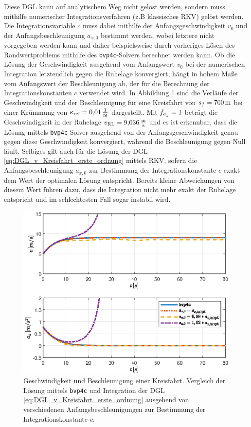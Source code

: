Diese \gls{DGL} kann auf analytischem Weg nicht gelöst werden, sondern muss mithilfe numerischer Integrationsverfahren (z.B klassisches \gls{RKV}) gelöst werden. Die Integrationsvariable $c$ muss dabei mithilfe der Anfangsgeschwindigkeit $v_0$ und der  Anfangsbeschleunigung $a_{x,0}$ bestimmt werden, wobei letztere nicht vorgegeben werden kann und daher beispielsweise durch vorheriges Lösen des Randwertproblems mithilfe des \texttt{bvp4c}-Solvers berechnet werden kann. Ob die Lösung der Geschwindigkeit ausgehend vom Anfangswert $v_0$ bei der numerischen Integration letztendlich gegen die Ruhelage konvergiert, hängt in hohem Maße vom Anfangswert der Beschleunigung ab, der für die Berechnung der Integrationskonstanten $c$ verwendet wird. In Abbildung \ref{fig:va_bvp4c_vs_odesol} sind die Verläufe der Geschwindigkeit und der Beschleunigung für eine Kreisfahrt von $s_f = 700\,\mathrm{m}$ bei einer Krümmung von $\kappa_{\textrm{ref}} = 0{,}01\,\mathrm{\frac{1}{\mathrm{m}}}$ dargestellt. Mit $f_{a_y} = 1$ beträgt die Geschwindigkeit in der Ruhelage $v_{\textrm{RL}} = 9{,}036\,\mathrm{\frac{\mathrm{m}}{\mathrm{s}}}$ und es ist erkennbar, dass die Lösung mittels \texttt{bvp4c}-Solver ausgehend von der Anfangsgeschwindigkeit genau gegen diese Geschwindigkeit konvergiert, während die Beschleunigung gegen Null läuft. Selbiges gilt auch für die Lösung der \gls{DGL} \eqref{eq:DGL_v_Kreisfahrt_erste_ordnung} mittels \gls{RKV}, sofern die Anfangsbeschleunigung $a_{x,0}$ zur Bestimmung der Integrationskonstante $c$ exakt dem Wert der optimalen Lösung entspricht. Bereits kleine Abweichungen von diesem Wert führen dazu, dass die Integration nicht mehr exakt der Ruhelage entspricht und im schlechtesten Fall sogar instabil wird. 
\begin{figure}[h] 
	\centering
	\includegraphics[width=0.8\linewidth]{./Bilder/Ergebnisse/Kreisfahrt/Ohne_Querdynamik/va_bvp4c_vs_odesol.eps}
	\caption{Geschwindigkeit und Beschleunigung einer Kreisfahrt. Vergleich der Lösung mittels \texttt{bvp4c} und Integration der \gls{DGL} \eqref{eq:DGL_v_Kreisfahrt_erste_ordnung} ausgehend von verschiedenen Anfangsbeschleunigungen zur Bestimmung der Integrationskonstante $c$.}
	\label{fig:va_bvp4c_vs_odesol}
\end{figure} 
